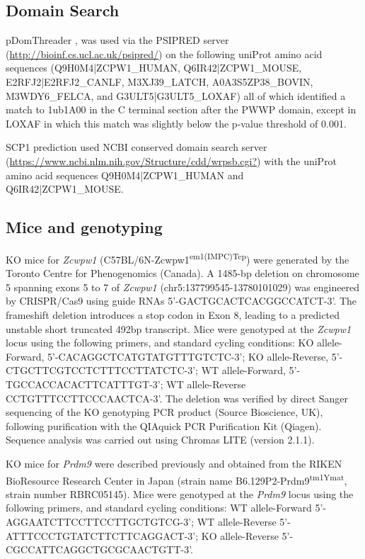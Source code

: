 \subsection{Domain Search}
\label{sec:threading}
pDomThreader \parencite{Lobley2009pGenTHREADER}, was used via the PSIPRED server (\url{http://bioinf.cs.ucl.ac.uk/psipred/}) on the following uniProt amino acid sequences (Q9H0M4|ZCPW1\_HUMAN, Q6IR42|ZCPW1\_MOUSE, E2RFJ2|E2RFJ2\_CANLF, M3XJ39\_LATCH, A0A3S5ZP38\_BOVIN, M3WDY6\_FELCA, and G3ULT5|G3ULT5\_LOXAF) all of which identified a match to 1ub1A00 in the C terminal section after the PWWP domain, except in LOXAF in which this match was slightly below the p-value threshold of 0.001.

SCP1 prediction used NCBI conserved domain search server (\url{https://www.ncbi.nlm.nih.gov/Structure/cdd/wrpsb.cgi?}) with the uniProt amino acid sequences Q9H0M4|ZCPW1\_HUMAN and Q6IR42|ZCPW1\_MOUSE.

\subsection{Mice and genotyping}
\label{sec:komice}
KO mice for \textit{Zcwpw1} (C57BL/6N-Zcwpw1\textsuperscript{em1(IMPC)Tcp}) were generated by the Toronto Centre for Phenogenomics (Canada).
A 1485-bp deletion on chromosome 5 spanning exons 5 to 7 of \textit{Zcwpw1} (chr5:137799545-13780101029) was engineered by CRISPR/Cas9 using guide RNAs 5’-GACTGCACTCACGGCCATCT-3’.
The frameshift deletion introduces a stop codon in Exon 8, leading to a predicted unstable short truncated 492bp transcript.
Mice were genotyped at the \textit{Zcwpw1} locus using the following primers, and standard cycling conditions: KO allele-Forward, 5’-CACAGGCTCATGTATGTTTGTCTC-3’; KO allele-Reverse, 5’-CTGCTTCGTCCTCTTTCCTTATCTC-3’; WT allele-Forward, 5’-TGCCACCACACTTCATTTGT-3’; WT allele-Reverse CCTGTTTCCTTCCCAACTCA-3’.
The deletion was verified by direct Sanger sequencing of the KO genotyping PCR product (Source Bioscience, UK), following purification with the QIAquick PCR Purification Kit (Qiagen).
Sequence analysis was carried out using Chromas LITE (version 2.1.1).


KO mice for \textit{Prdm9} were described previously \parencite{Hayashi2005histone} and obtained from the RIKEN BioResource Research Center in Japan (strain name B6.129P2-Prdm9\textsuperscript{tm1Ymat}, strain number RBRC05145).
Mice were genotyped at the \textit{Prdm9} locus using the following primers, and standard cycling conditions: WT allele-Forward 5’-AGGAATCTTCCTTCCTTGCTGTCG-3’; WT allele-Reverse 5’-ATTTCCCTGTATCTTCTTCAGGACT-3’; KO allele-Reverse 5’-CGCCATTCAGGCTGCGCAACTGTT-3’.

